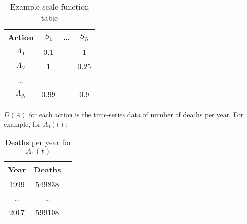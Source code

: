\documentclass[12pt, a4paper, twocolumn]{article}
\begin{document}
\begin{table}[H]
\centering
\begin{tabular}{cccc}
\toprule
Action & $S_1$  & \ldots & $S_N$  \\
\midrule
$A_1$  & 0.1    &        & 1      \\
$A_2$  & 1      &        & 0.25   \\
\ldots &        &        &        \\
$A_N$  & 0.99   &        & 0.9    \\
\bottomrule
\end{tabular}
\caption{Example scale function table}
\label{table:scaletable}
\end{table}

$D(A)$ for each action is the time-series data of number of deaths per year. For example, for $A_1(t)$:

\begin{table}[H]
\centering
\begin{tabular}{ccc}
\toprule
Year    & Deaths \\
\midrule
1999    & 549838 \\
\ldots  & \ldots \\
2017    & 599108 \\
\bottomrule
\end{tabular}
\caption{Deaths per year for $A_1(t)$}
\label{table:daa1}
\end{table}


\nocite{*}

\end{document}
